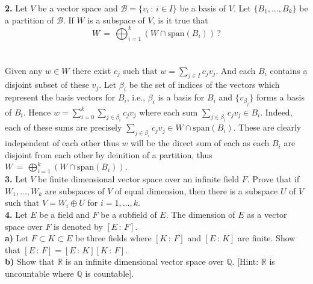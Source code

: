 \documentclass[11pt]{amsart}
\theoremstyle{definition}  %
\newcommand{\Q}{\mathbb{Q}}
\newcommand{\R}{\mathbb{R}}
\begin{document}
\vskip 0.1cm
\noindent 
{\bf 2.} Let $V$ be a vector space and $\mathcal{B} = \{ v_i \, : \, i
\in I \}$ be a basis of $V$. Let $\{ B_1, \ldots, B_k\}$ be a 
partition of $\mathcal{B}$.
If $W$ is a subspace of $V$, is it true that
$$ W \, = \, \bigoplus_{i=1}^k ( W \cap \mathrm{span}(B_i)) \, ? $$\\
\\
Given any $w \in W$ there exist $c_j$ such that $w = \sum_{j \in I} c_jv_j$.  And each $B_i$ contains a disjoint subset of these $v_j$.  Let $\beta_i$ be the set of indices of the vectors which represent the basis vectors for $B_i$, i.e., $\beta_i$ is a basis for $B_i$ and $\{ v_{\beta_j}\}$ forms a basis of $B_i$.  Hence $w=\sum_{i=0}^k \sum_{j \in \beta_i} c_jv_j$ where each sum $\sum_{j \in \beta_i} c_jv_j \in B_i$.  Indeed, each of these sums are precisely $\sum_{j \in \beta_i} c_jv_j \in W\cap \mathrm{span}(B_i)$.  These are clearly independent of each other thus $w$ will be the direct sum of each as each $B_i$ are disjoint from each other by deinition of a partition, thus $W \, = \, \bigoplus_{i=1}^k ( W \cap \mathrm{span}(B_i))$.
\\

\vskip 0.1cm
\noindent
{\bf 3.} Let $V$ be finite dimensional vector space over an infinite
field $F$. Prove that if $W_1, \ldots, W_k$ are subspaces of $V$ 
of equal dimension, then there is a subspace $U$ of $V$ such that $V = W_i \oplus U$ for $i=1,\ldots, k$. \\

\vskip 0.1cm
\noindent
{\bf 4.} Let $E$ be a field and  $F$ be a subfield of $E$. The dimension of $E$ as a vector space over $F$ is denoted by $[E \, : \, F]$. \\
{\bf a)} Let $F \subset K \subset E$ be three fields where $[K \, : \, F]$ and $[E \, : \, K]$ are finite. Show that $[E \, : \, F] = [E \, : \, K] [K \, : \, F]$. \\ 
{\bf b)} Show that $\R$ is an infinite dimensional vector space over $\Q$. [Hint: $\R$ is uncountable where $\Q$ is countable]. \\
\end{document}
